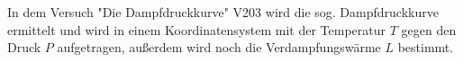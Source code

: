 In dem Versuch "Die Dampfdruckkurve" V203 wird die sog. Dampfdruckkurve ermittelt
und wird in einem Koordinatensystem mit der Temperatur $T$ gegen den Druck $P$ aufgetragen,
außerdem wird noch die Verdampfungswärme $L$ bestimmt.

